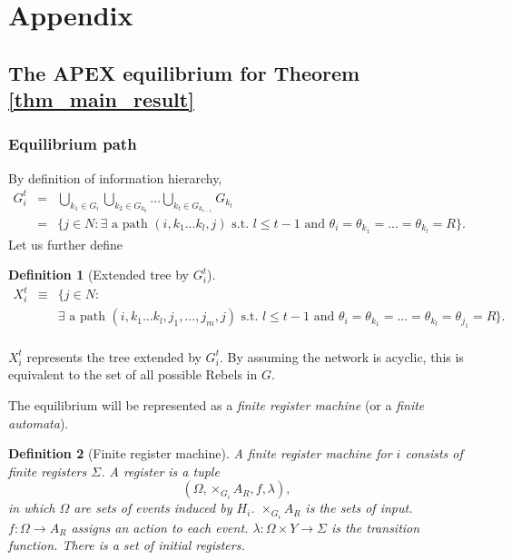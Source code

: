 \documentclass[12pt,letter]{article}
\newtheorem{definition}{Definition}[section]
\theoremstyle{definition}
\theoremstyle{remark}
\theoremstyle{claim}
\begin{document}


\appendix
\section{Appendix}
\subsection{The APEX equilibrium for Theorem \ref{thm_main_result}}
\subsubsection{Equilibrium path}
By definition of information hierarchy, 
\begin{eqnarray*}
G^t_i & = & \bigcup_{k_1\in G_i}\bigcup_{k_2\in G_{k_0}}...\bigcup_{k_{t}\in G_{k_{t-1}}}G_{k_{t}}\\
&= & \{j\in N: \text{$\exists$ a path $(i,k_1...k_{l},j)$ s.t.~$l\leq t-1$ and $\theta_i=\theta_{k_1}=...=\theta_{k_l}=R$}\}.
\end{eqnarray*}
Let us further define
\begin{definition}[Extended tree by $G^t_i$]
\label{def:ext_tree}
\begin{eqnarray*}
X^t_i & \equiv &  \{j\in N: \\
	& & \text{$\exists$ a path $(i,k_1...k_{l},j_1,...,j_m,j)$ s.t.~$l\leq t-1$ and $\theta_i=\theta_{k_1}=...=\theta_{k_l}=\theta_{j_1}=R$}\}.\\
\end{eqnarray*}
\end{definition}
$X^t_i $ represents the tree extended by $G^t_i$. By assuming the network is acyclic, this is equivalent to the set of all possible Rebels in $G$. 

The equilibrium will be represented as a \textit{finite register machine} (or a \textit{finite automata}). 
\begin{definition}[Finite register machine]
A finite register machine for $i$ consists of finite registers $\Sigma$. A register is a tuple \[(\Omega, \times_{G_i}A_R,f,\lambda),\] in which $\Omega$ are sets of events induced by $H_i$. $\times_{G_i}A_R$ is the sets of input. $f:\Omega\rightarrow A_{R}$ assigns an action to each event. $\lambda: \Omega\times Y \rightarrow \Sigma$ is the transition function. There is a set of initial registers. 
\end{definition}
\end{document}
